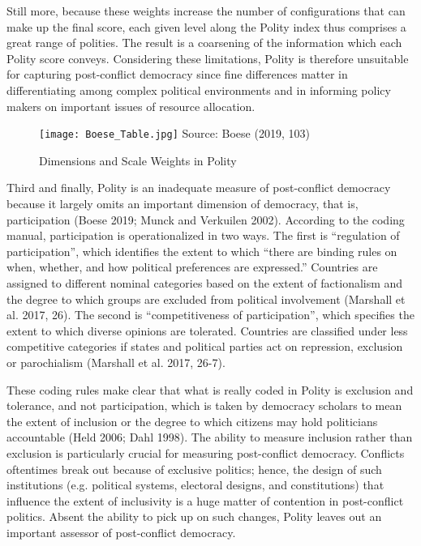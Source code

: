 \documentclass [11pt]{article}
\begin{document}
Still more, because these weights increase the number of configurations that can make up the final score, each given level along the Polity index thus comprises a great range of polities. The result is a coarsening of the information which each Polity score conveys. Considering these limitations, Polity is therefore unsuitable for capturing post-conflict democracy since fine differences matter in differentiating among complex political environments and in informing policy makers on important issues of resource allocation.

\begin{figure} [h!]

\caption{Dimensions and Scale Weights in Polity}
\label{fig1}%
\begin{center} 
\small
 \texttt{[image: Boese\_Table.jpg]}
{\footnotesize Source: Boese (2019, 103)}

\end{center} 
\end{figure}

Third and finally, Polity is an inadequate measure of post-conflict democracy because it largely omits an important dimension of democracy, that is, participation (Boese 2019; Munck and Verkuilen 2002). According to the coding manual, participation is operationalized in two ways. The first is ``regulation of participation'', which identifies the extent to which ``there are binding rules on when, whether, and how political preferences are expressed.'' Countries are assigned to different nominal categories based on the extent of factionalism and the degree to which groups are excluded from political involvement (Marshall et al. 2017, 26). The second is ``competitiveness of participation'', which specifies the extent to which diverse opinions are tolerated. Countries are classified under less competitive categories if states and political parties act on repression, exclusion or parochialism (Marshall et al. 2017, 26-7).

These coding rules make clear that what is really coded in Polity is exclusion and tolerance, and not participation, which is taken by democracy scholars to mean the extent of inclusion or the degree to which citizens may hold politicians accountable (Held 2006; Dahl 1998). The ability to measure inclusion rather than exclusion is particularly crucial for measuring post-conflict democracy. Conflicts oftentimes break out because of exclusive politics; hence, the design of such institutions (e.g. political systems, electoral designs, and constitutions) that influence the extent of inclusivity is a huge matter of contention in post-conflict politics. Absent the ability to pick up on such changes, Polity leaves out an important assessor of post-conflict democracy.
\end{document}
